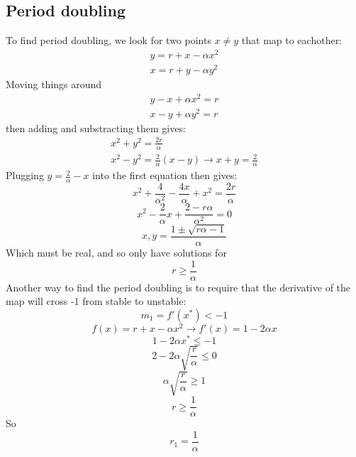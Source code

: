 \documentclass{article}
\begin{document}
\subsection{Period doubling}
To find period doubling, we look for two points $x \ne y$ that map to eachother:
\begin{equation}
\begin{gathered}
    y = r + x - \alpha x^2
    \\
    x = r + y - \alpha y^2
\end{gathered}
\end{equation}
Moving things around
\begin{equation}
\begin{gathered}
    y - x + \alpha x^2 = r
    \\
    x - y + \alpha y^2 = r
\end{gathered}
\end{equation}
then adding and substracting them gives:
\begin{equation}
\begin{gathered}
    x^2 + y^2 = \frac{2r}{\alpha}
    \\
    x^2 - y^2 = \frac{2}{\alpha}(x - y) \rightarrow
    x + y = \frac{2}{\alpha}
\end{gathered}
\end{equation}
Plugging $y = \frac{2}{\alpha} - x$ into the first equation then gives:
\begin{equation}
    x^2 + \frac{4}{\alpha^2} - \frac{4x}{\alpha} + x^2 = \frac{2r}{\alpha}
\end{equation}
\begin{equation}
    x^2 - \frac{2}{\alpha}x + \frac{2 - r\alpha}{\alpha^2} = 0
\end{equation}
\begin{equation}
    x, y = \frac{1 \pm \sqrt{r\alpha - 1}}{\alpha}
\end{equation}
Which must be real, and so only have solutions for
\begin{equation}
    r \ge \frac{1}{\alpha}
\end{equation}
Another way to find the period doubling is to require that the derivative of the map will cross -1 from stable to unstable:
\begin{equation}
    m_1 = f'(x^*) < -1
\end{equation}
\begin{equation}
    f(x) = r + x - \alpha x^2 \rightarrow f'(x) = 1 - 2\alpha x
\end{equation}
\begin{equation}
    1 - 2\alpha x^* \le -1
\end{equation}
\begin{equation}
    2 - 2\alpha \sqrt{\frac{r}{\alpha}} \le 0
\end{equation}
\begin{equation}
    \alpha \sqrt{\frac{r}{\alpha}} \ge 1
\end{equation}
\begin{equation}
    r \ge \frac{1}{\alpha}
\end{equation}
So
\begin{equation}
    r_1 = \frac{1}{\alpha}
\end{equation}
\end{document}
